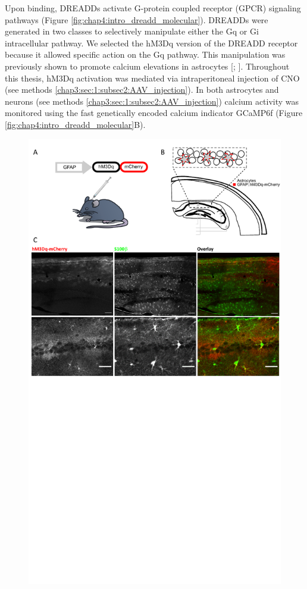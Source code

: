 Upon binding, DREADDs activate G-protein coupled receptor (GPCR) signaling pathways (Figure \ref{fig:chap4:intro_dreadd_molecular}). 
DREADDs were generated in two classes to selectively manipulate either the Gq or Gi intracellular pathway. 
We selected the hM3Dq version of the DREADD receptor because it allowed specific action on the Gq pathway. 
This manipulation was previously shown to promote calcium elevations in astrocytes [\cite{mu2019}; \cite{adamsky2018astrocytic}]. 
Throughout this thesis, hM3Dq activation was mediated via intraperitoneal injection of CNO (see methods \ref{chap3:sec:1:subsec2:AAV_injection}). 
In both astrocytes and neurons (see methods \ref{chap3:sec:1:subsec2:AAV_injection}) calcium activity was monitored using the fast genetically encoded calcium indicator GCaMP6f (Figure \ref{fig:chap4:intro_dreadd_molecular}B). 
\begin{figure}[h]
    \centering
    \includegraphics[trim={0 320 0 0},clip,width=\textwidth]{Figures/Chapter4/mcherry_dq_expression.pdf}

\end{figure}

